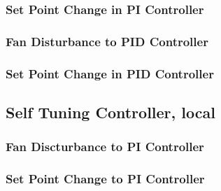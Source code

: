 \subsubsection{Set Point Change in PI Controller}
\begin{code}

\end{code}



\subsubsection{Fan Disturbance to PID Controller}
\begin{code}

\end{code}


\subsubsection{Set Point Change in PID Controller}
\begin{code}

\end{code}



\subsection{Self Tuning Controller, local}\label{selfcode_local}
\subsubsection{Fan Discturbance to PI Controller}
\begin{code}

\end{code}


\subsubsection{Set Point Change to PI Controller}
\begin{code}

\end{code}

